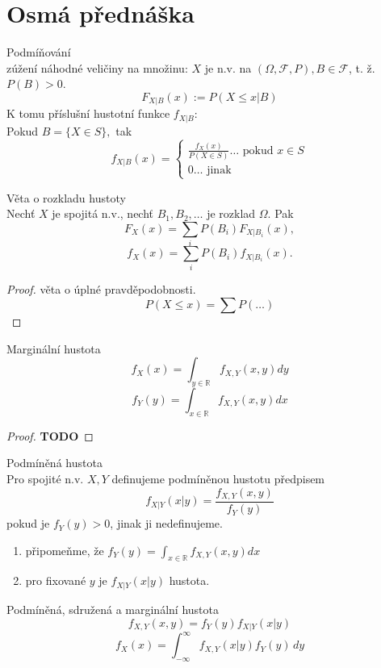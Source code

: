 \documentclass[../main.tex]{subfiles}
\begin{document}
\section{Osmá přednáška}

\begin{definition}
    Podmíňování\\

    zúžení náhodné veličiny na množinu: $X$ je n.v. na $(\Omega, \mathcal{F},P), B \in \mathcal{F}$, t. ž. $P(B) >0$.
    \[F_{X|B}(x):= P(X \leq x |B)\]
    K tomu příslušní hustotní funkce $f_{X|B}$:\\
    Pokud $B = \{X\in S\},$ tak 
    \[f_{X|B}(x) = 
    \begin{cases}    
        \frac{f_X(x)}{P(X\in S)} \dots \text{ pokud } x\in S\\
        0 \dots \text{ jinak }
    \end{cases}\]
\end{definition}
\begin{theorem}
    Věta o rozkladu hustoty\\

    Nechť $X$ je spojitá n.v., nechť $B_1,B_2,\dots$ je rozklad $\Omega$. Pak
    \[F_X(x) = \sum_i P(B_i)F_{X|B_i}(x),\]
    \[f_X(x) = \sum_i P(B_i)f_{X|B_i}(x).\]
    \begin{proof}
        věta o úplné pravděpodobnosti. 
        \[P(X\leq x) = \sum P(\dots)\]
    \end{proof}
\end{theorem}

\begin{theorem}
    Marginální hustota\\

    \[f_X(x) = \int_{y\in \mathbb{R}} f_{X,Y}(x,y)dy\]
    \[f_Y(y) = \int_{x\in \mathbb{R}} f_{X,Y}(x,y)dx\]
\end{theorem}
\begin{proof}
    \textbf{TODO}
\end{proof}

\begin{definition}
    Podmíněná hustota\\

    Pro spojité n.v. $X,Y$ definujeme podmíněnou hustotu předpisem
    \[f_{X|Y}(x|y) = \frac{f_{X,Y}(x,y)}{f_{Y}(y)}\]
    pokud je $f_Y(y) > 0$, jinak ji nedefinujeme.
    \begin{enumerate}
        \item připomeňme, že $f_Y(y) = \int_{x\in \mathbb{R}}f_{X,Y}(x,y)dx$
        \item pro fixované $y$ je $f_{X|Y}(x|y)$ hustota.
    \end{enumerate}
\end{definition}
\begin{theorem}
    Podmíněná, sdružená a marginální hustota\\

    \[f_{X,Y}(x,y) = f_Y(y)f_{X|Y}(x|y)\]
    \[f_X(x) = \int^\infty_{-\infty} f_{X,Y}(x|y)f_Y(y)\,dy\]
\end{theorem}
\end{document}
